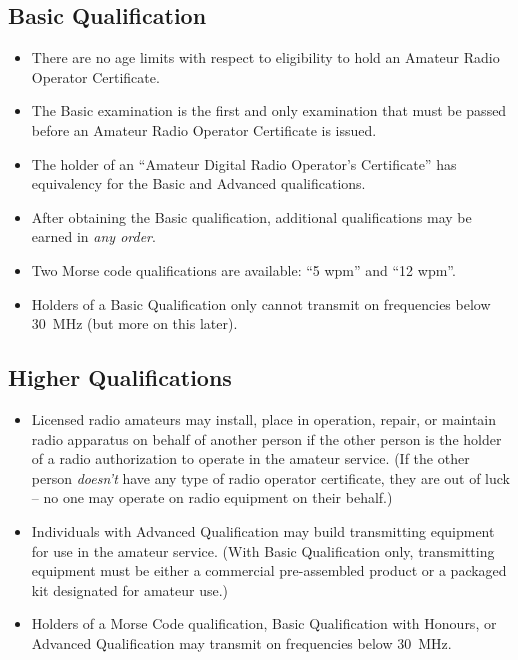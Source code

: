 \documentclass[letterpaper,12pt]{scrartcl}
\begin{document}
\subsection{Basic Qualification}

\begin{itemize}
\item There are no age limits with respect to eligibility to hold an Amateur Radio Operator Certificate.
\item The Basic examination is the first and only examination that must be passed before an Amateur Radio Operator Certificate is issued.
\item The holder of an ``Amateur Digital Radio Operator's Certificate'' has equivalency for the Basic and Advanced qualifications.
\item After obtaining the Basic qualification, additional qualifications may be earned in \textit{any order}.
\item Two Morse code qualifications are available: ``5 wpm'' and ``12 wpm''.
\item Holders of a Basic Qualification only cannot transmit on frequencies below 30~MHz (but more on this later).
\end{itemize}

\subsection{Higher Qualifications}

\begin{itemize}
\item Licensed radio amateurs may install, place in operation, repair, or maintain radio apparatus on behalf of another person
if the other person is the holder of a radio authorization to operate in the amateur service.
(If the other person \textit{doesn't} have any type of radio operator certificate, they are out of luck -- no one may operate on radio equipment on their behalf.)
\item Individuals with Advanced Qualification may build transmitting equipment for use in the amateur service.
(With Basic Qualification only, transmitting equipment must be either a commercial pre-assembled product or a packaged kit designated for amateur use.)
\item Holders of a Morse Code qualification, Basic Qualification with Honours, or Advanced Qualification may transmit on frequencies below 30~MHz.
\end{itemize}
\end{document}
